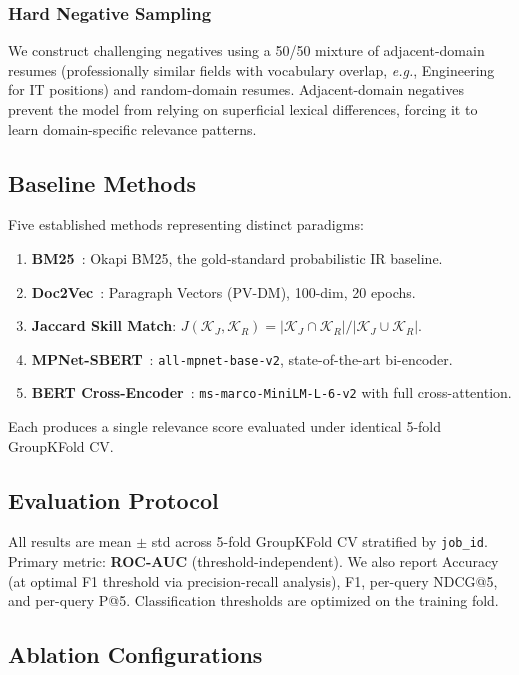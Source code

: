 \documentclass{svproc}
\begin{document}
\subsubsection{Hard Negative Sampling}
We construct challenging negatives using a 50/50 mixture of adjacent-domain resumes (professionally similar fields with vocabulary overlap, \textit{e.g.}, Engineering for IT positions) and random-domain resumes. Adjacent-domain negatives prevent the model from relying on superficial lexical differences, forcing it to learn domain-specific relevance patterns.

\subsection{Baseline Methods}

Five established methods representing distinct paradigms:
\begin{enumerate}
    \item \textbf{BM25}~\cite{robertson2009probabilistic}: Okapi BM25, the gold-standard probabilistic IR baseline.
    \item \textbf{Doc2Vec}~\cite{le2014doc2vec}: Paragraph Vectors (PV-DM), 100-dim, 20 epochs.
    \item \textbf{Jaccard Skill Match}: $J(\mathcal{K}_J, \mathcal{K}_R) = |\mathcal{K}_J \cap \mathcal{K}_R|/|\mathcal{K}_J \cup \mathcal{K}_R|$.
    \item \textbf{MPNet-SBERT}~\cite{song2020mpnet}: \texttt{all-mpnet-base-v2}, state-of-the-art bi-encoder.
    \item \textbf{BERT Cross-Encoder}~\cite{nogueira2019crossencoder}: \texttt{ms-marco-MiniLM-L-6-v2} with full cross-attention.
\end{enumerate}

Each produces a single relevance score evaluated under identical 5-fold GroupKFold CV.

\subsection{Evaluation Protocol}

All results are mean $\pm$ std across 5-fold GroupKFold CV stratified by \texttt{job\_id}. Primary metric: \textbf{ROC-AUC} (threshold-independent). We also report Accuracy (at optimal F1 threshold via precision-recall analysis), F1, per-query NDCG@5, and per-query P@5. Classification thresholds are optimized on the training fold.

\subsection{Ablation Configurations}
\end{document}
